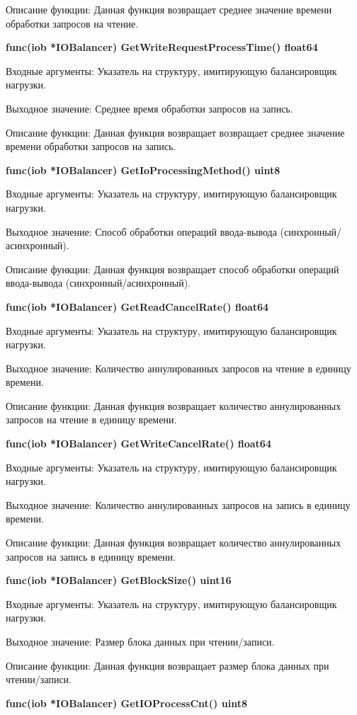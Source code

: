Описание функции: Данная функция возвращает среднее значение времени обработки запросов на чтение.

\textbf{func(iob *IOBalancer) GetWriteRequestProcessTime() float64}

Входные аргументы: Указатель на структуру, имитирующую балансировщик нагрузки.

Выходное значение: Среднее время обработки запросов на запись.

Описание функции: Данная функция возвращает возвращает среднее значение времени обработки запросов на запись.

\textbf{func(iob *IOBalancer) GetIoProcessingMethod() uint8}

Входные аргументы: Указатель на структуру, имитирующую балансировщик нагрузки.

Выходное значение: Способ обработки операций ввода-вывода (синхронный/асинхронный).

Описание функции: Данная функция возвращает способ обработки операций ввода-вывода (синхронный/асинхронный).

\textbf{func(iob *IOBalancer) GetReadCancelRate() float64}

Входные аргументы: Указатель на структуру, имитирующую балансировщик нагрузки.

Выходное значение: Количество аннулированных запросов на чтение в единицу времени.

Описание функции: Данная функция возвращает количество аннулированных запросов на чтение в единицу времени.

\textbf{func(iob *IOBalancer) GetWriteCancelRate() float64}

Входные аргументы: Указатель на структуру, имитирующую балансировщик нагрузки.

Выходное значение: Количество аннулированных запросов на запись в единицу времени. 

Описание функции: Данная функция возвращает количество аннулированных запросов на запись в единицу времени.

\textbf{func(iob *IOBalancer) GetBlockSize() uint16}

Входные аргументы: Указатель на структуру, имитирующую балансировщик нагрузки.

Выходное значение:  Размер блока данных при чтении/записи.

Описание функции: Данная функция возвращает  размер блока данных при чтении/записи.

\textbf{func(iob *IOBalancer) GetIOProcessCnt() uint8}

